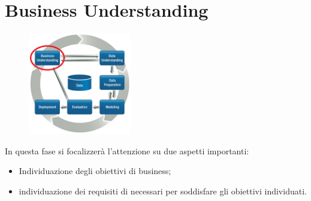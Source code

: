 \chapter{Business Understanding}
\begin{figure}[hbtp]
	\centering
	\includegraphics[width=0.4\textwidth]{./images/CRISPDM_1.png}
	\label{CRISPDM_1}
\end{figure}
In questa fase si focalizzerà l'attenzione su due aspetti importanti:
\begin{itemize}
	\item Individuazione degli obiettivi di business;
	\item individuazione dei requisiti di necessari per soddisfare gli obiettivi individuati.
\end{itemize}
